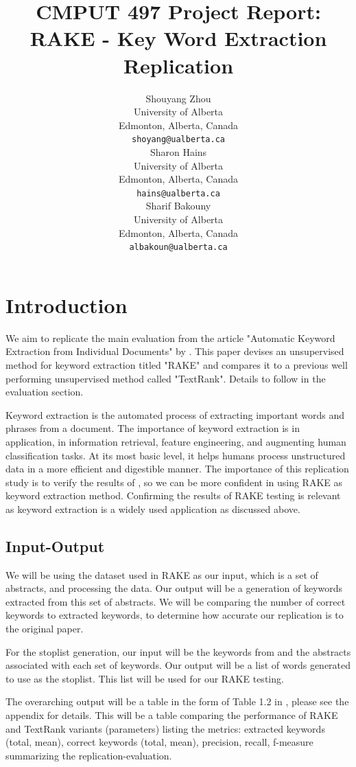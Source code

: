 \documentclass[11pt,a4paper]{article}
\title{CMPUT 497 Project Report: \\ RAKE - Key Word Extraction Replication}
\author{Shouyang Zhou \\
  University of Alberta \\
  Edmonton, Alberta, Canada \\
  {\tt shoyang@ualberta.ca} \\\And
  Sharon Hains \\
  University of Alberta \\
  Edmonton, Alberta, Canada \\
  {\tt hains@ualberta.ca} \\\And
  Sharif Bakouny \\
  University of Alberta \\
  Edmonton, Alberta, Canada \\
  {\tt albakoun@ualberta.ca} \\}
\date{}
\begin{document}
\maketitle

\section{Introduction}

We aim to replicate the main evaluation from the article "Automatic Keyword Extraction from Individual Documents" by \citet{1}. This paper devises an unsupervised method for keyword extraction titled "RAKE" and compares it to a previous well performing unsupervised method called "TextRank". Details to follow in the evaluation section.

Keyword extraction is the automated process of extracting important words and phrases from a document. The importance of keyword extraction is in application, in information retrieval, feature engineering, and augmenting human classification tasks. At its most basic level, it helps humans process unstructured data in a more efficient and digestible manner. The importance of this replication study is to verify the results of \citet{1}, so we can be more confident in using RAKE as keyword extraction method. Confirming the results of RAKE testing is relevant as keyword extraction is a widely used application as discussed above. 

\subsection{Input-Output}
We will be using the dataset used in RAKE as our input, which is a set of abstracts, and processing the data. Our output will be a generation of keywords extracted from this set of abstracts. We will be comparing the number of correct keywords to extracted keywords, to determine how accurate our replication is to the original paper.

For the stoplist generation, our input will be the keywords from \citep{hulth-2003-improved} and the abstracts associated with each set of keywords. Our output will be a list of words generated to use as the stoplist. This list will be used for our RAKE testing. 

The overarching output will be a table in the form of Table 1.2 in \citet{1}, please see the appendix for details. This will be a table comparing the performance of RAKE and TextRank variants (parameters) listing the metrics: extracted keywords (total, mean), correct keywords (total, mean), precision, recall, f-measure summarizing the replication-evaluation.
\end{document}
